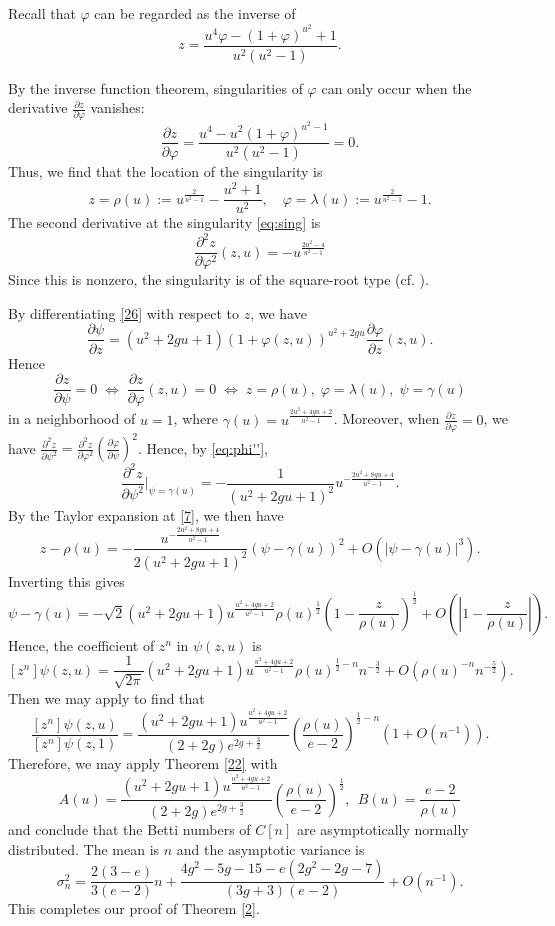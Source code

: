\documentclass[11pt,letterpaper]{amsart}
\numberwithin{equation}{section}
\theoremstyle{definition}
\def\beq{\begin{equation}}
\def\eeq{\end{equation}}
\begin{document}
Recall that $\varphi$ can be regarded as the inverse of
\[ z=\frac{u^4\varphi-(1+\varphi)^{u^2}+1}{u^2(u^2-1)}.\]

By the inverse function theorem, singularities of $\varphi$ can only occur when the derivative $ \frac{\partial z}{\partial \varphi}$ vanishes:
\[\frac{\partial z}{\partial \varphi}= \frac{u^4-u^2(1+\varphi)^{u^2-1}}{u^2(u^2-1)}=0.  \]
Thus, we find that the location of the singularity is
\beq\label{eq:sing} z= \rho(u) := u^{\frac{2}{u^2-1}}- \frac{u^2+1}{u^2}, \hspace{1em} \varphi = \lambda(u):= u^\frac{2}{u^2-1}-1. \eeq
The second derivative at the singularity \eqref{eq:sing} is
\beq\label{eq:phi''}\frac{\partial^2 z}{\partial \varphi^2}(z, u)=-u^{\frac{2u^2-4}{u^2-1}}  \eeq
Since this is nonzero, the singularity is of the square-root type (cf. \cite[IX.7.3.]{FS}).


By differentiating \eqref{26} with respect to $z$, we have
\[
\frac{\partial \psi}{\partial z}=(u^2+2gu +1)(1+\varphi(z, u))^{u^2+2g u}\frac{\partial \varphi}{\partial z}(z, u).\]
Hence
\beq\label{7}\frac{\partial z}{\partial \psi}=0 \;\Leftrightarrow \;
\frac{\partial z}{\partial \varphi}(z, u)=0 \;\Leftrightarrow \;
z=\rho(u),\; \varphi=\lambda(u), \; \psi=\gamma(u)\eeq
in a neighborhood of $u=1$, where
$\gamma(u)=u^{\frac{2u^2+4gu+2}{u^2-1}}$.
Moreover, when $\frac{\partial z}{\partial \varphi}=0$, we have $\frac{\partial^2 z}{\partial \psi^2} = \frac{\partial^2 z}{\partial \varphi^2} \left(\frac{\partial \varphi}{\partial \psi}\right)^2$. Hence, by \eqref{eq:phi''},
\[
\frac{\partial^2z}{\partial \psi^2}\bigg|_{\psi=\gamma(u)}=-\frac{1}{(u^2+2gu+1)^2}u^{-\frac{2u^2+8gu+4}{u^2-1}}.
\]
By the Taylor expansion at \eqref{7}, we then have
\[
z-\rho(u) =-\frac{u^{-\frac{2u^2+8gu+4}{u^2-1}}}{2(u^2+2gu+1)^2}
(\psi-\gamma(u))^2+O\left(|\psi-\gamma(u)|^3\right).\]
Inverting this gives
\[
\psi-\gamma(u) = -\sqrt{2} (u^2+2gu+1) u^{\frac{u^2+4gu+2}{u^2-1}}\rho(u)^\frac12
\left(1-\frac{z}{\rho(u)}\right)^\frac12+O\left(\left|1-\frac{z}{\rho(u)}\right|\right).\]
Hence, the coefficient of $z^n$ in $\psi(z,u)$ is
\[ [z^n]\psi(z,u) = \frac{1}{\sqrt{2\pi}}(u^2+2gu+1) u^{\frac{u^2+4gu+2}{u^2-1}}\rho(u)^{\frac12-n}n^{-\frac32} +O(\rho(u)^{-n}n^{-\frac52}). \]
Then we may apply \cite[Theorem VI.4]{FS} %
to find that
\[  \frac{[z^n]\psi(z,u)}{[z^n]\psi(z,1)}=
\frac{(u^2+2gu+1) u^{\frac{u^2+4gu+2}{u^2-1}}}{(2+2g)e^{2g+\frac32}} \left(\frac{\rho(u)}{e-2}\right)^{\frac12 -n}  \left(1+O(n^{-1})\right).\]
Therefore, we may apply Theorem \ref{22} with
\[A(u)=\frac{(u^2+2gu+1) u^{\frac{u^2+4gu+2}{u^2-1}}}{(2+2g)e^{2g+\frac32}}\left(\frac{\rho(u)}{e-2}\right)^{\frac12}, \ \  B(u)=\frac{e-2}{\rho(u)}\]
and conclude that the Betti numbers of $C[n]$ are asymptotically normally distributed. The mean is $n$ and the asymptotic variance is
\[ \sigma_n^2 = \frac{2(3-e)}{3(e-2)}n+ \frac{4g^2-5g-15-e(2g^2-2g-7)}{(3g+3)(e-2)} + O(n^{-1}).\]
This completes our proof of Theorem \ref{2}.
\end{document}
